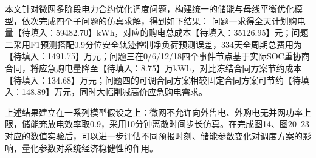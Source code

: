 
本文针对微网多阶段电力合约优化调度问题，构建统一的储能与母线平衡优化模型，依次完成四个子问题的仿真求解，得到如下结果：
问题一求得全天计划购电量【待填入：59482.70】$\mathrm{kWh}$，对应的购电总成本【待填入：35126.95】元；问题二采用F1预测搭配0.9分位安全轨迹控制净负荷预测误差，334天全周期总费用为【待填入：1491.75】万元；问题三在0/6/12/18四个事件节点基于实际SOC重协商合同，将应急购电量降至【待填入：8.75】万$\mathrm{kWh}$，对比冻结合同方案节约成本【待填入：134.68】万元；问题四的可调合同方案相较固定合同方案可节约【待填入：148.89】万元，同时大幅削减高价应急购电需求。

上述结果建立在一系列模型假设之上：微网不允许向外售电、外购电无并网功率上限，储能充放电效率取0.9，采用10分钟离散时间步长仿真。在完成图14、图20--23对应的数值实验后，可以进一步评估不同预报时刻、储能参数变化对调度方案的影响，量化参数对系统经济稳健性的作用。